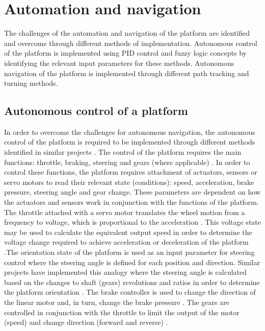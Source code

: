 \documentclass[main.tex]{subfiles}
\begin{document}
\section{Automation and navigation}
The challenges of the automation and navigation of the platform are identified and overcome through different methods of implementation. Autonomous control of the platform is implemented using PID control and fuzzy logic concepts by identifying the relevant input parameters for these methods. Autonomous navigation of the platform is implemented through different path tracking and turning methods.  

\subsection{Autonomous control of a platform}
In order to overcome the challenges for autonomous navigation, the autonomous control of the platform is required to be implemented through different methods identified in similar projects \parencite{zhao2012design,scheiner2011}. The control of the platform requires the main functions: throttle, braking, steering and gears (where applicable) \parencite{zhao2012design}. In order to control these functions, the platform requires attachment of actuators, sensors or servo motors to read their relevant state (conditions): speed, acceleration, brake pressure, steering angle and gear change. These parameters are dependent on how the actuators and sensors work in conjunction with the functions of the platform. The throttle attached with a servo motor translates the wheel motion from a frequency to voltage, which is proportional to the acceleration \parencite{zhao2012design,scheiner2011}. This voltage state may be used to calculate the equivalent output speed in order to determine the voltage change required to achieve acceleration or deceleration of the platform \parencite{scheiner2011}.The orientation state of the platform is used as an input parameter for steering control where the steering angle is defined for each position and direction. Similar projects have implemented this analogy where the steering angle is calculated based on the changes to shaft (gears) revolutions and ratios in order to determine the platform orientation \parencite{zhang2010study,zhao2012design}. The brake controller is used to change the direction of the linear motor and, in turn, change the brake pressure \parencite{zhao2012design}. The gears are controlled in conjunction with the throttle to limit the output of the motor (speed) and change direction (forward and reverse) \parencite{tran2007modelling}.
\end{document}
